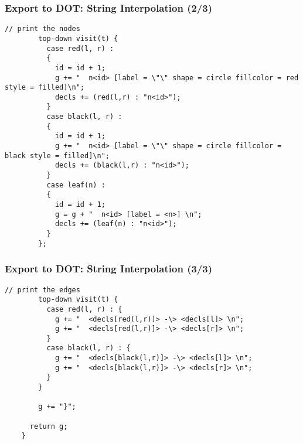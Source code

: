 \documentclass{beamer}
\begin{document}
\begin{frame}[fragile]
  \frametitle{Export to DOT: String Interpolation (2/3)}

  \begin{small}
    \begin{lstlisting}[language=Rascal]
        // print the nodes
        top-down visit(t) {
          case red(l, r) :
          {
            id = id + 1;
            g += "  n<id> [label = \"\" shape = circle fillcolor = red style = filled]\n";
            decls += (red(l,r) : "n<id>");
          }
          case black(l, r) :
          {
            id = id + 1;
            g += "  n<id> [label = \"\" shape = circle fillcolor = black style = filled]\n";
            decls += (black(l,r) : "n<id>");
          }
          case leaf(n) :
          {
            id = id + 1;
            g = g + "  n<id> [label = <n>] \n";
            decls += (leaf(n) : "n<id>");
          }
        };
\end{lstlisting}
  \end{small}
\end{frame}

\begin{frame}[fragile]
  \frametitle{Export to DOT: String Interpolation (3/3)}
  \begin{small}
    \begin{lstlisting}[language=Rascal]
        // print the edges
        top-down visit(t) {
          case red(l, r) : {
            g += "  <decls[red(l,r)]> -\> <decls[l]> \n";
            g += "  <decls[red(l,r)]> -\> <decls[r]> \n";
          }
          case black(l, r) : {
            g += "  <decls[black(l,r)]> -\> <decls[l]> \n";
            g += "  <decls[black(l,r)]> -\> <decls[r]> \n";
          }
        }

        g += "}";

      return g;
    }
  \end{lstlisting}  
  \end{small}  
\end{frame}


\end{document}
